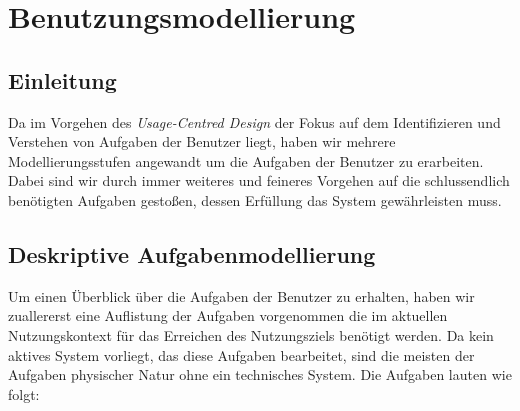 \section{Benutzungsmodellierung}
\label{sec:Benutzungsmodellierung}

\subsection{Einleitung}
\label{sec:Benutzungsmodellierung Einleitung}

Da im Vorgehen des \textit{Usage-Centred Design} der Fokus auf dem
Identifizieren und Verstehen von Aufgaben der Benutzer liegt, haben wir mehrere
Modellierungsstufen angewandt um die Aufgaben der Benutzer zu erarbeiten.
Dabei sind wir durch immer weiteres und feineres Vorgehen auf die schlussendlich
benötigten Aufgaben gestoßen, dessen Erfüllung das System gewährleisten muss.

\subsection{Deskriptive Aufgabenmodellierung}
\label{sec:Deskriptive Aufgabenmodellierung}
Um einen Überblick über die Aufgaben der Benutzer zu erhalten, haben wir
zuallererst eine Auflistung der Aufgaben vorgenommen die im aktuellen
Nutzungskontext für das Erreichen des Nutzungsziels benötigt werden. 
Da kein aktives System vorliegt, das diese Aufgaben bearbeitet, sind die 
meisten der Aufgaben physischer Natur ohne ein technisches System. 
Die Aufgaben lauten wie folgt:

